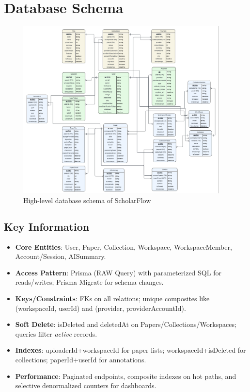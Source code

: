\chapter{Database Schema}
\label{ch:database-schema}

\begin{figure}[H]
\centering
\includegraphics[width=0.95\textwidth]{images/diagrams/schema.png}
\caption{High-level database schema of ScholarFlow}
\label{fig:db-schema}
\end{figure}

\section*{Key Information}
\begin{itemize}[leftmargin=*,topsep=3pt,itemsep=2pt]
  \item \textbf{Core Entities}: User, Paper, Collection, Workspace, WorkspaceMember, Account/Session, AISummary.
  \item \textbf{Access Pattern}: Prisma (RAW Query) with parameterized SQL for reads/writes; Prisma Migrate for schema changes.
  \item \textbf{Keys/Constraints}: FKs on all relations; unique composites like (workspaceId, userId) and (provider, providerAccountId).
  \item \textbf{Soft Delete}: isDeleted and deletedAt on Papers/Collections/Workspaces; queries filter \emph{active} records.
  \item \textbf{Indexes}: uploaderId+workspaceId for paper lists; workspaceId+isDeleted for collections; paperId+userId for annotations.
  \item \textbf{Performance}: Paginated endpoints, composite indexes on hot paths, and selective denormalized counters for dashboards.
\end{itemize}
